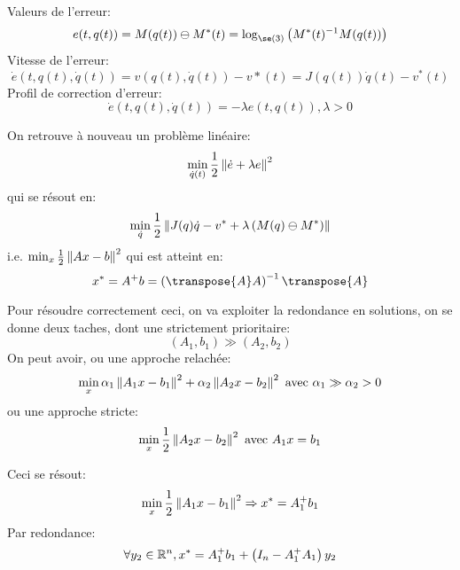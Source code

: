 \documentclass[math]{cours}
\begin{document}
\begin{proposition}
	Valeurs de l'erreur:
	\begin{equation*}
		e(t, q(t)) = M(q(t)) \ominus M^{*}(t) = \log_{\se(3)}\left(M^{*}(t)^{-1}M(q(t)) \right)
	\end{equation*}
	Vitesse de l'erreur:
	\begin{equation*}
		\dot{e}(t, q(t), \dot{q}(t)) = v(q(t), \dot{q}(t)) - v*(t) = J(q(t))\dot{q}(t) - v^{*}(t)
	\end{equation*}
	Profil de correction d'erreur:
	\begin{equation*}
	\dot{e}(t, q(t), \dot{q}(t)) = -\lambda e(t, q(t)), \lambda > 0
	\end{equation*}
	\label{prop:erreurs}
\end{proposition}

On retrouve à nouveau un problème linéaire:
\begin{equation*}
	\min_{\dot{q}(t)}\frac{1}{2}\left\lVert \dot{e} + \lambda e\right\rVert^{2}
\end{equation*}
qui se résout en:
\begin{equation*}
	\min_{\dot{q}}\frac{1}{2}\left\lVert J(q)\dot{q} - v^{*} + \lambda\left( M(q)\ominus M^{*} \right)\right\rVert
\end{equation*}
i.e. $\min_{x} \frac{1}{2}\left\lVert Ax - b\right\rVert^{2}$ qui est atteint en:
\begin{equation*}
	x^{*} = A^{+}b = \left(\transpose{A}A\right)^{-1}\transpose{A}
\end{equation*}

Pour résoudre correctement ceci, on va exploiter la redondance en solutions, on se donne deux taches, dont une strictement prioritaire:
\begin{equation*}
	(A_{1}, b_{1}) \gg (A_{2}, b_{2})
\end{equation*}
On peut avoir, ou une approche relachée:
\begin{equation*}
	\min_{x} \alpha_{1}\left\lVert A_{1} x -b_{1}\right\rVert^{2} + \alpha_{2}\left\lVert A_{2}x - b_{2}\right\rVert^{2} \text{ avec } \alpha_{1} \gg \alpha_{2} > 0
\end{equation*}
ou une approche stricte:
\begin{equation*}
	\min_{x}\frac{1}{2}\left\lVert A_{2}x - b_{2}\right\rVert^{2} \text{ avec } A_{1}x = b_{1}
\end{equation*}

Ceci se résout:
\begin{equation*}
	\min_{x}\frac{1}{2}\left\lVert A_{1}x - b_{1}\right\rVert^{2} \Rightarrow x^{*} = A_{1}^{+}b_{1}
\end{equation*}
Par redondance:
\begin{equation*}
	\forall y_{2} \in \mathbb{R}^{n}, x^{*} = A_{1}^{+}b_{1} + \left(I_{n} - A_{1}^{+}A_{1}\right)y_{2}
\end{equation*}
\end{document}
